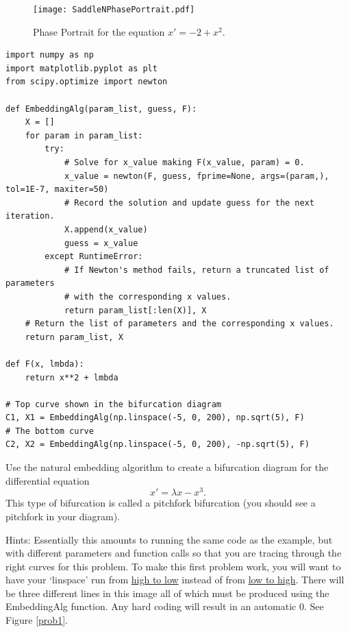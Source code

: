 \begin{figure}
\centering
\texttt{[image: SaddleNPhasePortrait.pdf]}
\caption{Phase Portrait for the equation $x' = -2 + x^2$.}
\label{phaseportrait:sn}
\end{figure}

\newpage
\begin{lstlisting}
import numpy as np
import matplotlib.pyplot as plt
from scipy.optimize import newton

def EmbeddingAlg(param_list, guess, F):
    X = []
    for param in param_list:
        try:
            # Solve for x_value making F(x_value, param) = 0.
            x_value = newton(F, guess, fprime=None, args=(param,), tol=1E-7, maxiter=50)
            # Record the solution and update guess for the next iteration.
            X.append(x_value)
            guess = x_value
        except RuntimeError:
            # If Newton's method fails, return a truncated list of parameters
            # with the corresponding x values.
            return param_list[:len(X)], X
    # Return the list of parameters and the corresponding x values.
    return param_list, X

def F(x, lmbda):
    return x**2 + lmbda

# Top curve shown in the bifurcation diagram
C1, X1 = EmbeddingAlg(np.linspace(-5, 0, 200), np.sqrt(5), F)
# The bottom curve
C2, X2 = EmbeddingAlg(np.linspace(-5, 0, 200), -np.sqrt(5), F)
\end{lstlisting}

\begin{problem}
Use the natural embedding algorithm to create a bifurcation diagram for the differential equation
\[x' = \lambda x-x^3.\]
This type of bifurcation is called a pitchfork bifurcation (you should see a pitchfork in your diagram).

Hints: Essentially this amounts to running the same code as the example, but with different parameters and function calls so that you are tracing through the right curves for this problem.
To make this first problem work, you will want to have your `linspace' run from \underline{high to low} instead of from \underline{low to high}.
There will be three different lines in this image all of which must be produced using the EmbeddingAlg function. Any hard coding will result in an automatic 0.
See Figure \ref{prob1}.
\end{problem}


